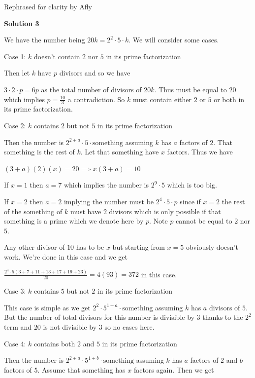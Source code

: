 \begin{enumerate}
 Rephrased for clarity by Afly

 



\textbf{Solution 3}

We have the number being $20k = 2^2 \cdot 5 \cdot k$. We will consider some cases.

 Case 1: $k$ doesn't contain $2$ nor $5$ in its prime factorization

 Then let $k$ have $p$ divisors and so we have

 $3 \cdot 2 \cdot p = 6p$ as the total number of divisors of $20k$. Thus must be equal to $20$ which implies $p = \frac{10}{3}$ a contradiction. So $k$ must contain either $2$ or $5$ or both in its prime factorization.

 Case 2: $k$ contains $2$ but not $5$ in its prime factorization

 Then the number is $2^{2 + a} \cdot 5 \cdot \text{something}$ assuming $k$ has $a$ factors of $2$. That something is the rest of $k$. Let that something have $x$ factors. Thus we have

 $(3 + a)(2)(x) = 20 \implies x(3 + a) = 10$

 If $x = 1$ then $a = 7$ which implies the number is $2^9 \cdot 5$ which is too big.

 If $x = 2$ then $a = 2$ implying the number must be $2^4 \cdot 5 \cdot p$ since if $x = 2$ the rest of the something of $k$ must have $2$ divisors which is only possible if that something is a prime which we denote here by $p$. Note $p$ cannot be equal to $2$ nor $5$.

 Any other divisor of $10$ has to be $x$ but starting from $x = 5$ obviously doesn't work. We're done in this case and we get

 $\frac{2^4 \cdot 5(3 + 7 + 11 + 13 + 17 + 19 + 23)}{20} = 4(93) = 372$ in this case.

 Case 3: $k$ contains $5$ but not $2$ in its prime factorization

 This case is simple as we get $2^2 \cdot 5^{1 + a} \cdot \text{something}$ assuming $k$ has $a$ divisors of $5$. But the number of total divisors for this number is divisible by $3$ thanks to the $2^2$ term and $20$ is not divisible by $3$ so no cases here.

 Case 4: $k$ contains both $2$ and $5$ in its prime factorization

 Then the number is $2^{2 + a} \cdot 5^{1 + b} \cdot \text{something}$ assuming $k$ has $a$ factors of $2$ and $b$ factors of $5$. Assume that something has $x$ factors again. Then we get


\end{enumerate}

